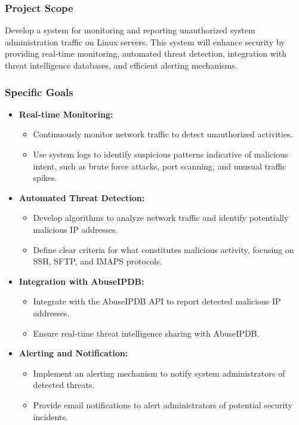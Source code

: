\documentclass{article}
\begin{document}
    \subsubsection{Project Scope}\label{subsubsec:project-scope}
    Develop a system for monitoring and reporting unauthorized system administration traffic on Linux servers.
    This system will enhance security by providing real-time monitoring, automated threat detection, integration with threat intelligence databases, and efficient alerting mechanisms.

    \subsubsection{Specific Goals}\label{subsubsec:specific-goals}

    \begin{itemize}
        \item \textbf{Real-time Monitoring:}
        \begin{itemize}
            \item Continuously monitor network traffic to detect unauthorized activities.
            \item Use system logs to identify suspicious patterns indicative of malicious intent, such as brute force attacks, port scanning, and unusual traffic spikes.
        \end{itemize}

        \item \textbf{Automated Threat Detection:}
        \begin{itemize}
            \item Develop algorithms to analyze network traffic and identify potentially malicious IP addresses.
            \item Define clear criteria for what constitutes malicious activity, focusing on SSH, SFTP, and IMAPS protocols.
        \end{itemize}

        \item \textbf{Integration with AbuseIPDB:}
        \begin{itemize}
            \item Integrate with the AbuseIPDB API to report detected malicious IP addresses.
            \item Ensure real-time threat intelligence sharing with AbuseIPDB\@.
        \end{itemize}

        \item \textbf{Alerting and Notification:}
        \begin{itemize}
            \item Implement an alerting mechanism to notify system administrators of detected threats.
            \item Provide email notifications to alert administrators of potential security incidents.
        \end{itemize}


\end{itemize}
\end{document}
